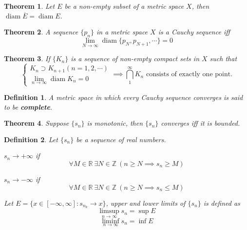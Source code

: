 \documentclass[aps,pra,onecolumn,notitlepage,superscriptaddress]{revtex4-1}
\newcommand{\Z}{\mathbb{Z}}
\newcommand{\R}{\mathbb{R}}
\newcommand{\op}[1]{\operatorname{#1}}
\newtheorem{theo}{Theorem}
\newtheorem{defi}{Definition}
\begin{document}
    \begin{theo}
        Let $E$ be a non-empty subset of a metric space $X$, then $\op{diam} \overline{E} = \op{diam} E$. 
    \end{theo}

    \begin{theo}
        A sequence $\{p_n\}$ in a metric space $X$ is a Cauchy sequence iff
        \begin{equation}
            \lim_{N \to \infty} \op{diam} \{ p_N, p_{N+1}, \cdots \} = 0
        \end{equation}
    \end{theo}

    \begin{theo}
        If $\{K_n\}$ is a sequence of non-empty compact sets in $X$ such that 
        \begin{equation}
            \begin{cases}
                K_n \supset K_{n+1} (n=1,2,\cdots) \\
                \lim_{n \to \infty} \op{diam} K_n = 0 
            \end{cases}
            \implies \text{$\bigcap_1^\infty K_n$ consists of exactly one point.}
        \end{equation} 
    \end{theo}

    \begin{defi}
        A metric space in which every Cauchy sequence converges is said to be \textbf{complete}.
    \end{defi}

    \begin{theo}
        Suppose $\{s_n\}$ is monotonic, then $\{s_n\}$ converges iff it is bounded.
    \end{theo}

    \begin{defi}
        Let $\{s_n\}$ be a sequence of real numbers. 
        
        $s_n \to +\infty$ if
        \begin{equation}
            \forall M \in \R \ \exists N \in \Z \ (n \geq N \implies s_n \geq M)
        \end{equation}

        $s_n \to -\infty$ if
        \begin{equation}
            \forall M \in \R \ \exists N \in \Z \ (n \geq N \implies s_n \leq M)
        \end{equation}

        Let $E = \{ x \in [-\infty, \infty] : s_{n_k} \to x \}$, upper and lower limits of $\{s_n\}$ is defined as
        \begin{equation}
            \limsup_{n \to \infty} s_n = \sup E
        \end{equation}
        \begin{equation}
            \liminf_{n \to \infty} s_n = \inf E
        \end{equation}
    \end{defi}
\end{document}
